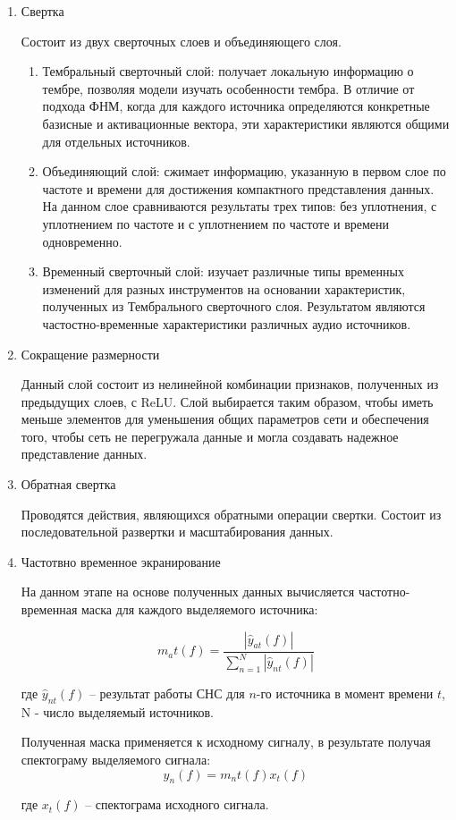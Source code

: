 \begin{enumerate}
	\item Свертка
	
	Состоит из двух сверточных слоев и объединяющего слоя. 
	\begin{enumerate}
		\item Тембральный сверточный слой: получает локальную информацию о тембре, позволяя модели изучать особенности тембра. В отличие от подхода ФНМ, когда для каждого источника определяются конкретные базисные и активационные вектора, эти характеристики являются общими для отдельных источников.
		\item Объединяющий слой: сжимает информацию, указанную в первом слое по частоте и времени для достижения компактного представления данных. На данном слое сравниваются результаты трех типов: без уплотнения, с уплотнением по частоте и с уплотнением по частоте и времени одновременно.
		\item Временный сверточный слой: изучает различные типы временных изменений для разных инструментов на основании характеристик, полученных из Тембрального сверточного слоя. Результатом являются частостно-временные характеристики различных аудио источников. 
	\end{enumerate}
	
	\item Сокращение размерности
	
	Данный слой состоит из нелинейной комбинации признаков, полученных из предыдущих слоев, с ReLU. Слой выбирается таким образом, чтобы иметь меньше элементов для уменьшения общих параметров сети и обеспечения того, чтобы сеть не перегружала данные и могла создавать надежное представление данных.
	
	\item Обратная свертка
	
	Проводятся действия, являющихся обратными операции свертки. Состоит из последовательной развертки и масштабирования данных.
	
	\item Частотвно временное экранирование
	
	На данном этапе на основе полученных данных вычисляется частотно-временная маска для каждого выделяемого источника:
	
	\begin{equation}
	m_a t (f) = \frac{|\hat{y}_{at}(f)|}{\sum_{n=1}^{N} |\hat{y}_{nt}(f)|}
	\end{equation}
	
	где $\hat{y}_{nt}(f)$ -- результат работы СНС для $n$-го источника в момент времени $t$, N - число выделяемый источников.
	
	Полученная маска применяется к исходному сигналу, в результате получая спектограму выделяемого сигнала:
	\begin{equation}
	y_n(f) = m_n t(f)x_t(f)
	\end{equation}
	
	где $x_t(f)$ -- спектограма исходного сигнала.
	
\end{enumerate}

